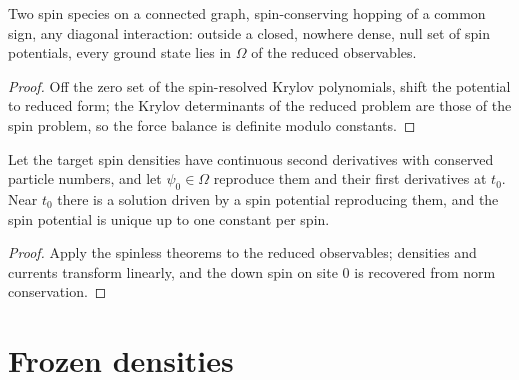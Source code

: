 \begin{theorem}
  \label{thm:generic_ground_spin}
  \leanok
  Two spin species on a connected graph, spin-conserving hopping of a common sign, any diagonal interaction: outside
  a closed, nowhere dense, null set of spin potentials, every ground state lies in $\Omega$ of the reduced observables.
\end{theorem}
\begin{proof}
  \leanok
  Off the zero set of the spin-resolved Krylov polynomials, shift the potential to reduced form; the Krylov
  determinants of the reduced problem are those of the spin problem, so the force balance is definite modulo
  constants.
\end{proof}

\begin{theorem}
  \label{thm:td_spin}
  \leanok
  Let the target spin densities have continuous second derivatives with conserved particle numbers, and let
  $\psi_0\in\Omega$ reproduce them and their first derivatives at $t_0$. Near $t_0$ there is a solution driven by a
  spin potential reproducing them, and the spin potential is unique up to one constant per spin.
\end{theorem}
\begin{proof}
  \leanok
  Apply the spinless theorems to the reduced observables; densities and currents transform linearly, and the down
  spin on site $0$ is recovered from norm conservation.
\end{proof}

\section{Frozen densities}

